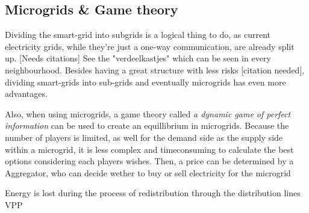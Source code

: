 \subsection{Microgrids \& Game theory}
Dividing the smart-grid into subgrids is a logical thing to do, as current electricity grids, while they're just a one-way communication, are already split up. [Needs citations] See the "verdeelkastjes" which can be seen in every neighbourhood. Besides having a great structure with less risks [citation needed], dividing smart-grids into sub-grids and eventually microgrids 
has even more advantages. 


Also, when using microgrids, a game theory called \emph{a dynamic game of perfect information} %
 can be used to create an equillibrium in microgrids. Because the number of players is limited, as well for the demand side as the supply side within a microgrid, it is less complex and timeconsuming to calculate the best options considering each players wishes. Then, a price can be determined by a Aggregator, who can decide wether to buy or sell electricity for the microgrid \cite{MicrogridModellingPetrosAristidou}


Energy is lost during the process of redistribution through the distribution lines
VPP
